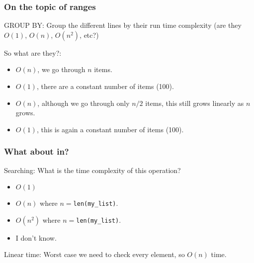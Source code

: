 \begin{frame}
	\frametitle{On the topic of ranges}



		
		GROUP BY:	Group the different lines by their run time complexity (are they $O(1)$, $O(n)$, $O(n^2)$, etc?)

	
	So what are they?:
		\begin{itemize}
			\item $O(n)$, we go through $n$ items.
			\item $O(1)$, there are a constant number of items (100).
			\item $O(n)$, although we go through only $n/2$ items, this still grows linearly as $n$ grows.
			\item $O(1)$, this is again a constant number of items (100).
		\end{itemize}
		
					

\end{frame}

\begin{frame}
	\frametitle{What about in?}
	Searching:
			What is the time complexity of this operation?
			\begin{itemize}
				\item $O(1)$
				\item $O(n)$ where $n = $\texttt{len(my\_list)}.
				\item $O(n^2)$ where $n = $\texttt{len(my\_list)}.
				\item I don't know.
			\end{itemize}
			
Linear time:	Worst case we need to check every element, so $O(n)$ time.

			

\end{frame}

